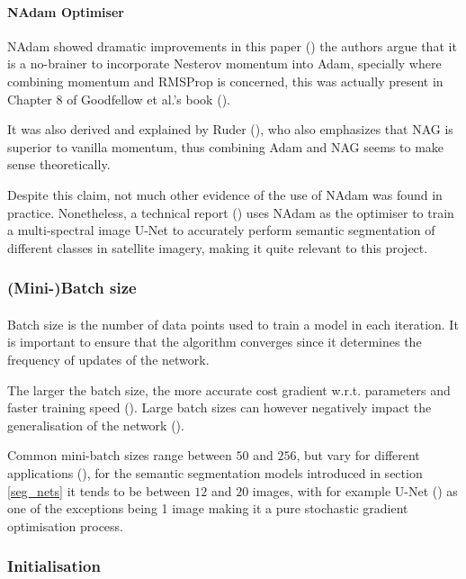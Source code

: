 \paragraph{\gls{NAdam} Optimiser}
\gls{NAdam} showed dramatic improvements in this paper (\cite{nadam}) the authors argue that it is a no-brainer to incorporate Nesterov momentum into \gls{Adam}, specially where combining momentum and \gls{RMSProp} is concerned, this was actually present in Chapter 8 of Goodfellow et al.'s book (\cite{GoodBengCour16}).

It was also derived and explained by Ruder (\cite{ruder2017overview}), who also emphasizes that \gls{NAG} is superior to vanilla momentum, thus combining \gls{Adam} and NAG seems to make sense theoretically. 

Despite this claim, not much other evidence of the use of \gls{NAdam} was found in practice. Nonetheless, a technical report (\cite{DBLP:journals/corr/IglovikovMO17}) uses \gls{NAdam} as the optimiser to train a multi-spectral image U-Net to accurately perform semantic segmentation of different classes in satellite imagery, making it quite relevant to this project.
\subsubsection{(Mini-)Batch size} \label{batch_size}
\paragraph{}
Batch size is the number of data points used to train a model in each iteration. It is important to ensure that the algorithm converges since it determines the frequency of updates of the network.

The larger the batch size, the more accurate cost gradient \gls{w.r.t.} parameters and faster training speed (\cite{deeplearning_ai}). Large batch sizes can however negatively impact the generalisation of the network (\cite{keskar2017largebatch}).

Common mini-batch sizes range between $50$ and $256$, but vary for different applications (\cite{ruder2017overview}), for the semantic segmentation models introduced in section \ref{seg_nets} it tends to be between $12$ and $20$ images, with for example U-Net (\cite{ronneberger2015unet}) as one of the exceptions being 1 image making it a pure stochastic gradient optimisation process.
\subsubsection{Initialisation} \label{initialisation}

